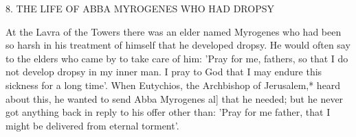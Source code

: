 8. THE LIFE OF ABBA MYROGENES
WHO HAD DROPSY

At the Lavra of the Towers there was an elder named Myrogenes
who had been so harsh in his treatment of himself that he developed
dropsy. He would often say to the elders who came by to take care
of him: 'Pray for me, fathers, so that I do not develop dropsy in my
inner man. I pray to God that I may endure this sickness for a long
time'. When Eutychios, the Archbishop of Jerusalem,* heard about
this, he wanted to send Abba Myrogenes al] that he needed; but he
never got anything back in reply to his offer other than: 'Pray for
me father, that I might be delivered from eternal torment'.

